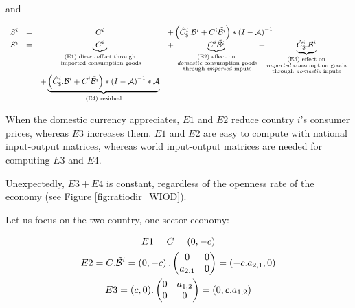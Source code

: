 \documentclass[12pt,a4paper]{article}
\begin{document}
and

\begin{equation}
\begin{array}{lccl}
S^ i&=&C^i	&+ \left(\hat{C}^i_\$.{\cal B}^i+{C^i}{\tilde{{\cal B}^i}}\right)*{{(I-{\cal A})}^{-1}} \\
S^i &=&\underbrace{C^i}_{\substack{\text{(E1) direct effect through} \\ \text{ imported consumption goods}}}&+ \underbrace{{C^i}{\tilde{{\cal B}^i}}}_{\substack{\text{(E2) effect on} \\ \text{ \emph{domestic} consumption goods} \\ \text{ through \emph{imported} inputs}}}  + \underbrace{\hat{C}^i_\$.{\cal B}^i}_{\substack{\text{(E3)  effect on} \\ \text{\emph{imported} consumption goods} \\ \text{through \emph{domestic} inputs}}} \\ &&+\underbrace {\left( \hat{C}^i_\$.{\cal B}^i + {C^i}{\tilde{{\cal B}^i}}\right)*{{(I-{\cal A})}^{-1}}*{\cal A}}_{\text{(E4) residual}} \\
\end{array}
\end{equation}



When the domestic currency appreciates, $E1$ and $E2$ reduce country $i$'s consumer prices, whereas $E3$ increases them. $E1$ and $E2$ are easy to compute with national input-output matrices, whereas world input-output matrices are needed for computing $E3$ and $E4$.

Unexpectedly, $E3 + E4$ is constant, regardless of the openness rate of the economy (see Figure \ref{fig:ratiodir_WIOD}).


Let us focus on the two-country, one-sector economy: 

\begin{gather*}
E1=C=\left(0,-c\right)
\\
E2=C.\tilde{\cal B}^i=\left(0,-c\right).\left(\begin{matrix}0&0\\a_{2,1}&0\end{matrix}\right)=\left(-c.a_{2,1},0\right)
\\
E3=(c,0).\left(\begin{matrix}0&a_{1,2}\\0&0\end{matrix}\right)=\left(0,c.a_{1,2}\right)
\end{gather*}
\end{document}
